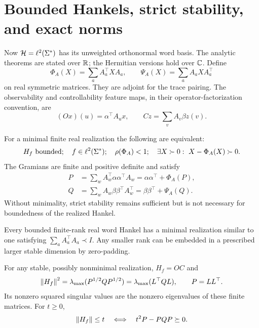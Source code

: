 \section{Bounded Hankels, strict stability, and exact norms}\label{I:S:sec:analytic}
Now $\mathcal H=\ell^2(\Sigma^*)$ has its unweighted orthonormal word basis. The analytic theorems are stated over $\mathbb R$; the Hermitian versions hold over $\mathbb C$. Define
\[
 \Phi_A(X)=\sum_a A_a^\top X A_a,\qquad
 \Psi_A(X)=\sum_a A_a X A_a^\top
\]
on real symmetric matrices. They are adjoint for the trace pairing. The observability and controllability feature maps, in their operator-factorization convention, are
\[
 (Ox)(u)=\alpha^\top A_u x,\qquad Cz=\sum_v A_v\beta z(v).
\]

\begin{theorem}\label{I:S:thm:stability}
For a minimal finite real realization the following are equivalent:
\[
 H_f\text{ bounded};\quad f\in\ell^2(\Sigma^*);\quad
 \rho(\Phi_A)<1;\quad
 \exists X\succ0:\ X-\Phi_A(X)\succ0.
\]
The Gramians are finite and positive definite and satisfy
\begin{align}
 P&=\sum_w A_w^\top\alpha\alpha^\top A_w
   =\alpha\alpha^\top+\Phi_A(P),\label{I:S:eq:P}\\
 Q&=\sum_w A_w\beta\beta^\top A_w^\top
   =\beta\beta^\top+\Psi_A(Q).\label{I:S:eq:Q}
\end{align}
Without minimality, strict stability remains sufficient but is not necessary for boundedness of the realized Hankel.
\end{theorem}


\begin{corollary}
Every bounded finite-rank real word Hankel has a minimal realization similar to one satisfying $\sum_a A_a^\top A_a\prec I$. Any smaller rank can be embedded in a prescribed larger stable dimension by zero-padding.
\end{corollary}


\begin{theorem}\label{I:S:thm:norm}
For any stable, possibly nonminimal realization, $H_f=OC$ and
\[
 \left\lVert H_f\right\rVert^2=\lambda_{\max}(P^{1/2}QP^{1/2})
              =\lambda_{\max}(L^\top QL),\qquad P=LL^\top.
\]
Its nonzero squared singular values are the nonzero eigenvalues of these finite matrices. For $t\ge0$,
\begin{equation}\label{I:S:eq:factorfree}
 \left\lVert H_f\right\rVert\le t\quad\Longleftrightarrow\quad t^2P-PQP\succeq0.
\end{equation}
\end{theorem}



